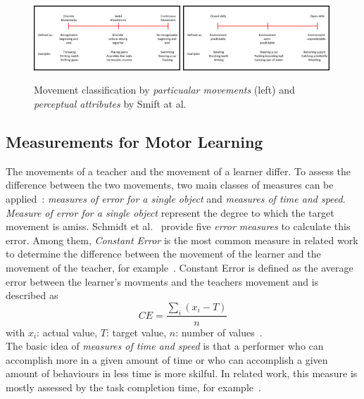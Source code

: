\begin{figure}[htb]
	\centering
	\includegraphics[width=0.49\textwidth]{figures/movement_classification.png}
	\includegraphics[width=0.49\textwidth]{figures/movement_classification2.png}
	\caption[Movement classifications by Scmidt et al.]{Movement classification by \textit{particualar movements} (left) and \textit{perceptual attributes} by Smift at al.~\cite{mlbook}}
	\label{fig:movement_classification}
\end{figure}

\subsection{Measurements for Motor Learning}
\label{section:measures_for_ml}
The movements of a teacher and the movement of a learner differ. To assess the difference between the two movements, two main classes of measures can be applied~\cite{mlbook}: \textit{measures of error for a single object} and \textit{measures of time and speed}.
\textit{Measure of error for a single object} represent the degree to which the target movement is amiss. Schmidt et al.~\cite{mlbook} provide five \textit{error measures} to calculate this error. Among them, \textit{Constant Error} is the most common measure in related work to determine the difference between the movement of the learner and the movement of the teacher, for example~\cite{perspectivematters,thaichichua,YouMove,onebody,vrdancetrainer,lightguide,physioathome}. Constant Error is defined as the average error between the learner's movments and the teachers movement and is described as
\begin{equation}
	\label{eq:constanterror}
	CE=\frac{\sum_i(x_i-T)}{n}
\end{equation}
with $x_i$: actual value, $T$: target value, $n$: number of values~\cite{mlbook}.\\
The basic idea of \textit{measures of time and speed} is that a performer who can accomplish more in a given amount of time or who can accomplish a given amount of behaviours in less time is more skilful. In related work, this measure is mostly assessed by the task completion time, for example~\cite{perspectivematters,onebody,lightguide}.


